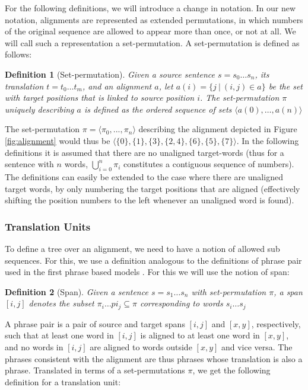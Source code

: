 \documentclass{report}
\theoremstyle{definition}
\theoremstyle{plain}
\newtheorem{definition}{Definition}
\begin{document}
For the following definitions, we will introduce a change in notation. In our new notation, alignments are represented as extended permutations, in which numbers of the original sequence are allowed to appear more than once, or not at all. We will call such a representation a set-permutation. A set-permutation is defined as follows:

\begin{definition}[Set-permutation]
Given a source sentence $s = s_0 \ldots s_n$, its translation $t = t_0 \ldots t_m$, and an alignment $a$, let $a(i) = \{j~|~(i,j)\in a\}$ be the set with target positions that is linked to source position $i$. The set-permutation $\pi$ uniquely describing $a$ is defined as the ordered sequence of sets
$\langle a(0), \ldots, a(n) \rangle$
\end{definition}

The set-permutation $\pi = \langle\pi_0, ..., \pi_n\rangle$ describing the alignment depicted in Figure \ref{fig:alignment} would thus be $\langle \{0\}, \{1\}, \{3\}, \{2,4\}, \{6\}, \{5\}, \{7\}\rangle$. In the following definitions it is assumed that there are no unaligned target-words (thus for a sentence with $n$ words, $\bigcup_{i=0}^n \pi_i$ constitutes a contiguous sequence of numbers). The definitions can easily be extended to the case where there are unaligned target words, by only numbering the target positions that are aligned (effectively shifting the position numbers to the left whenever an unaligned word is found).

\subsubsection{Translation Units} To define a tree over an alignment, we need to have a notion of allowed sub sequences. For this, we use a definition analogous to the definitions of phrase pair used in the first phrase based models \citep{och2004alignment}. For this we will use the notion of span:

\begin{definition}[Span]
Given a sentence $s = s_1\ldots s_n$ with set-permutation $\pi$, a span $[i,j]$ denotes the subset $\pi_i\ldots pi_j\subseteq \pi$ corresponding to words $s_i\ldots s_j$
\end{definition}

A phrase pair is a pair of source and target spans $[i,j]$ and $[x,y]$, respectively, such that at least one word in $[i,j]$ is aligned to at least one word in $[x,y]$, and no words in $[i,j]$ are aligned to words outside $[x,y]$ and vice versa. The phrases consistent with the alignment are thus phrases whose translation is also a phrase. Translated in terms of a set-permutations $\pi$, we get the following definition for a translation unit:
\end{document}
